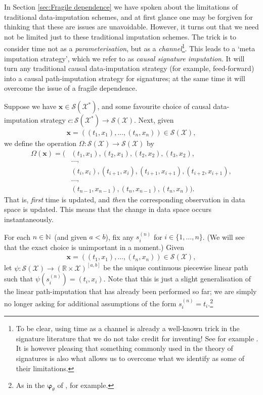 \documentclass{article}
\newcommand{\reals}{\mathbb{R}}
\newcommand{\naturals}{\mathbb{N}}
\newcommand{\dataspace}{\mathcal{X}}
\newcommand{\seriesspace}{\mathcal{S}}
\begin{document}
In Section \ref{sec:Fragile dependence} we have spoken about the limitations of traditional data-imputation schemes, and at first glance one may be forgiven for
thinking that these are issues are unavoidable. 
%
However, it turns out that we need not be limited just to these
traditional imputation schemes. The trick is to consider time not as
a \emph{parameterisation}, but as a \emph{channel}\footnote{To be clear, using time as a channel is already
a well-known trick in the signature literature that we do not take
credit for inventing! See for example \citet[Definition
A.3]{kidger2019deep}. It is however pleasing that something commonly
used in the theory of signatures is also what allows us to overcome what
we identify as some of their limitations.}.
%
This leads to a `meta imputation strategy', which we refer to as
\emph{causal signature imputation}. It will turn any traditional causal
data-imputation strategy (for example, feed-forward) into a causal
path-imputation strategy for signatures; at the same time it will
overcome the issue of a fragile dependence.

Suppose we have $\mathbf{x} \in \seriesspace(\dataspace^*)$, and some
favourite choice of causal data-imputation strategy $c \colon
\seriesspace(\dataspace^*) \to \seriesspace(\dataspace)$.
%
Next, given
%
\begin{align}
    \mathbf{x} = ((t_1, x_1), \ldots, (t_n, x_n)) \in \seriesspace(\dataspace),
\end{align}
%
we define the operation $\Omega \colon \seriesspace(\dataspace) \to \seriesspace(\dataspace)$ by
%
\begin{align}
    \Omega(\mathbf{x}) = (&(t_1, x_1), (t_2, x_1), (t_2, x_2),(t_3, x_2),\nonumber\\
    &\ldots,\nonumber\\
    &(t_i, x_i), (t_{i + 1}, x_i), (t_{i + 1}, x_{i + 1}), (t_{i + 2}, x_{i + 1}),\nonumber\\
    &\ldots,\nonumber\\
    &(t_{n - 1}, x_{n - 1}), (t_n, x_{n - 1}),(t_n, x_n)).\label{eq:causalsig}
\end{align}
%
That is, \emph{first} time is updated, and \emph{then} the corresponding observation
in data space is updated. This means that the change in data space
occurs instantaneously.

For each $n \in \naturals$~(and given $a < b$), fix any $s_i^{(n)}$ for
$i \in \{1, \ldots, n \}$. 
(We will see that the exact choice is unimportant in a moment.)
%
Given
%
\begin{align*}
    \mathbf{x} = ((t_1, x_1), \ldots, (t_n, x_n)) \in \seriesspace(\dataspace),
\end{align*}
%
let $\psi \colon \seriesspace(\dataspace) \to (\reals \times
\dataspace)^{[a, b]}$ be the unique continuous piecewise linear path
such that $\psi(s_i^{(n)}) = (t_i, x_i)$. Note that this is just
a slight generalisation of the linear path-imputation that has already
been performed so far; we are simply no longer asking for additional
assumptions of the form $s_i^{(n)} = t_i$.\footnote{As in the
$\mathbf{\varphi}_\theta$ of \cite{toth2019gp}, for example.}
\end{document}
